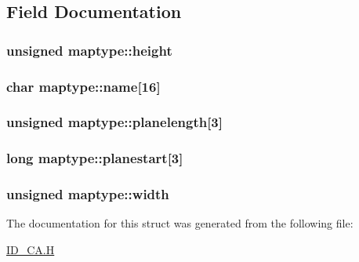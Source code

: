 \subsection{Field Documentation}
\hypertarget{structmaptype_aafa8427a59c612d538eda3f93ba6c15a}{
\subsubsection[{height}]{\setlength{\rightskip}{0pt plus 5cm}unsigned {\bf maptype::height}}}
\label{structmaptype_aafa8427a59c612d538eda3f93ba6c15a}
\hypertarget{structmaptype_a787c058c46642a7c15b942b67b93fcc6}{
\subsubsection[{name}]{\setlength{\rightskip}{0pt plus 5cm}char {\bf maptype::name}\mbox{[}16\mbox{]}}}
\label{structmaptype_a787c058c46642a7c15b942b67b93fcc6}
\hypertarget{structmaptype_a1a9d64fac15753bbae61f252e1b3bd7a}{
\subsubsection[{planelength}]{\setlength{\rightskip}{0pt plus 5cm}unsigned {\bf maptype::planelength}\mbox{[}3\mbox{]}}}
\label{structmaptype_a1a9d64fac15753bbae61f252e1b3bd7a}
\hypertarget{structmaptype_aada2e9a46239cff88af7f433a124bc85}{
\subsubsection[{planestart}]{\setlength{\rightskip}{0pt plus 5cm}long {\bf maptype::planestart}\mbox{[}3\mbox{]}}}
\label{structmaptype_aada2e9a46239cff88af7f433a124bc85}
\hypertarget{structmaptype_aa077c64d4805d9952378d9926bd0ccb0}{
\subsubsection[{width}]{\setlength{\rightskip}{0pt plus 5cm}unsigned {\bf maptype::width}}}
\label{structmaptype_aa077c64d4805d9952378d9926bd0ccb0}


The documentation for this struct was generated from the following file:\begin{DoxyCompactItemize}
\item 
\hyperlink{ID__CA_8H}{ID\_\-CA.H}\end{DoxyCompactItemize}
